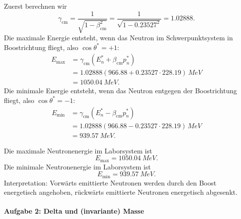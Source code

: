 \documentclass[11pt,a4paper]{scrartcl}
\begin{document}
\begin{enumerate}[label=(\alph*)]
\begin{calculationbox}
                \begin{calculationbox}
                    Zuerst berechnen wir
                    \[
                        \gamma_{\mathrm{cm} }
                        =\frac{1}{\sqrt{1-\beta_{\mathrm{cm}}^2}}
                        =\frac{1}{\sqrt{1-0.23527^2}}
                        =1.02888.
                    \]
                    Die maximale Energie entsteht, wenn das Neutron im Schwerpunktsystem in
                    Boostrichtung fliegt, also $\cos\theta^*=+1$:
                    \begin{align*}
                        E_{\max}
                        &=\gamma_{\mathrm{cm}}(E_n^*+\beta_{\mathrm{cm}}p_n^*)\\
                        &=1.02888\left(966.88+0.23527\cdot 228.19\right)\,\si{MeV}\\
                        &=\SI{1050.04}{MeV}.
                    \end{align*}
                    Die minimale Energie entsteht, wenn das Neutron entgegen der Boostrichtung
                    fliegt, also $\cos\theta^*=-1$:
                    \begin{align*}
                        E_{\min}
                        &=\gamma_{\mathrm{cm}}(E_n^*-\beta_{\mathrm{cm}}p_n^*)\\
                        &=1.02888\left(966.88-0.23527\cdot 228.19\right)\,\si{MeV}\\
                        &=\SI{939.57}{MeV}.
                    \end{align*}
                \end{calculationbox}
            \end{calculationbox}

            \begin{answerbox}
                Die maximale Neutronenergie im Laborsystem ist
                \[
                    \boxed{E_{\max}=\SI{1050.04}{MeV}.}
                \]
                Die minimale Neutronenergie im Laborsystem ist
                \[
                    \boxed{E_{\min}=\SI{939.57}{MeV}.}
                \]
                Interpretation: Vorwärts emittierte Neutronen werden durch den Boost energetisch
                angehoben, rückwärts emittierte Neutronen energetisch abgesenkt.
            \end{answerbox}
    \end{enumerate}

    \newpage
    \paragraph{Aufgabe 2: Delta und (invariante) Masse}
\end{document}
